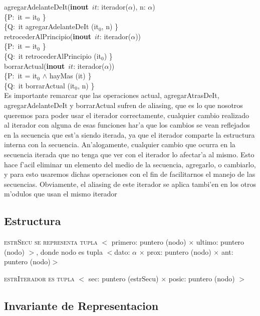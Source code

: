 \documentclass[a4paper,10pt]{article}
\begin{document}
\noindent agregarAdelanteDeIt(\textbf{inout}\ $it$: iterador($\alpha$), n: $\alpha$) \ \ \ \ \ \\
\indent \{P:\ it = it$_0$ \}  \\
\indent \{Q:\ it \igobs agregarAdelanteDeIt (it$_0$, n) \}\\

\noindent retrocederAlPrincipio(\textbf{inout}\ $it$: iterador($\alpha$)) \ \ \ \ \ \\
\indent \{P:\ it = it$_0$ \}  \\
\indent \{Q:\ it \igobs retrocederAlPrincipio (it$_0$) \}\\

\noindent borrarActual(\textbf{inout}\ $it$: iterador($\alpha$)) \ \ \ \ \ \\
\indent \{P:\ it = it$_0$ $\wedge$ hayMas (it) \}  \\
\indent \{Q:\ it \igobs borrarActual (it$_0$, n) \}\\

Es importante remarcar que las operaciones actual, agregarAtrasDeIt, agregarAdelanteDeIt y borrarActual sufren de aliasing, que es lo que nosotros queremos para poder usar el iterador correctamente, cualquier cambio realizado al iterador con alguna de esas funciones har'a que los cambios se vean reflejados en la secuencia que est'a siendo iterada, ya que el iterador comparte la estructura interna con la secuencia. An'alogamente, cualquier cambio que ocurra en la secuencia iterada que no tenga que ver con el iterador lo afectar'a al mismo. Esto hace f'acil eliminar un elemento del medio de la secuencia, agregarlo, o cambiarlo, y para esto usaremos dichas operaciones con el fin de facilitarnos el manejo de las secuencias.  Obviamente, el aliasing de este iterador se aplica tambi'en en los otros m'odulos que usan el mismo iterador

\newpage
\subsection{Estructura}

    \noindent \textsc{estrSecu se representa tupla} $<$ primero: puntero (nodo) $\times$ ultimo: puntero (nodo) $>$, donde nodo es tupla $<$dato: $\alpha$ $\times$ prox: puntero (nodo) $\times$ ant: puntero (nodo)$>$

    \noindent \textsc{estrIterador es tupla} $<$ sec: puntero (estrSecu) $\times$ posic: puntero (nodo) $>$


\subsection{Invariante de Representacion}
\end{document}
